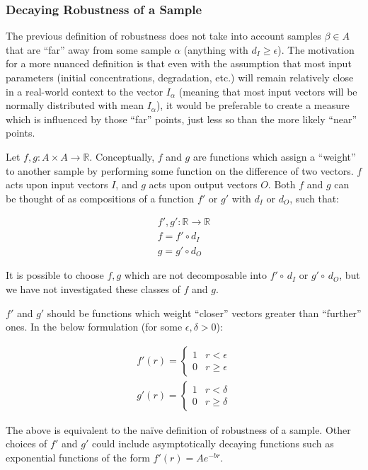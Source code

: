 \documentclass{article}
\begin{document}
\subsubsection{Decaying Robustness of a Sample}
The previous definition of robustness does not take into account samples $\beta \in A$ that are ``far'' away from some sample $\alpha$ (anything with $d_I \ge \epsilon$). The motivation for a more nuanced definition is that even with the assumption that most input parameters (initial concentrations, degradation, etc.) will remain relatively close in a real-world context to the vector $I_\alpha$ (meaning that most input vectors will be normally distributed with mean $I_\alpha$), it would be preferable to create a measure which is influenced by those ``far'' points, just less so than the more likely ``near'' points.

Let $f,g : A \times A \to \mathbb{R}$. Conceptually, $f$ and $g$ are functions which assign a ``weight'' to another sample by performing some function on the difference of two vectors. $f$ acts upon input vectors $I$, and $g$ acts upon output vectors $O$. Both $f$ and $g$ can be thought of as compositions of a function $f'$ or $g'$ with $d_I$ or $d_O$, such that:

\begin{align}
  f', g' : \mathbb{R} \to \mathbb{R} \\
  f = f' \circ d_I \\
  g = g' \circ d_O
\end{align}

It is possible to choose $f, g$ which are not decomposable into $f' \circ\, d_I$ or $g' \circ\, d_O$, but we have not investigated these classes of $f$ and $g$.

$f'$ and $g'$ should be functions which weight ``closer'' vectors greater than ``further'' ones. In the below formulation (for some $\epsilon, \delta > 0$):

\begin{align}
  f'(r) =
  \begin{cases}
    1 & r < \epsilon \\
    0 & r \ge \epsilon
  \end{cases} \\
  g'(r) =
  \begin{cases}
    1 & r < \delta \\
    0 & r \ge \delta
  \end{cases}
\end{align}

The above is equivalent to the na\"ive definition of robustness of a sample. Other choices of $f'$ and $g'$ could include asymptotically decaying functions such as exponential functions of the form $f'(r) = A e^{- b r}$.
\end{document}
